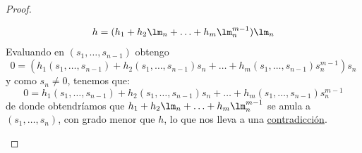 \begin{lema}
\begin{proof}
\begin{itemize}
                \begin{equation*}
                    h = (h_1 + h_2 \lm_n + \ldots + h_m \lm_n^{m-1})\lm_n
                \end{equation*}
                Evaluando en $(s_1, \ldots, s_{n-1})$ obtengo 
                \begin{equation*}
                    0 = (h_1(s_1, \ldots, s_{n-1}) + h_2(s_1, \ldots, s_{n-1})s_n + \ldots + h_m(s_1, \ldots, s_{n-1})s_n^{m-1})s_n
                \end{equation*}
                y como $s_n\neq 0$, tenemos que:
                \begin{equation*}
                     0 = h_1(s_1, \ldots, s_{n-1}) + h_2(s_1, \ldots, s_{n-1})s_n + \ldots + h_m(s_1, \ldots, s_{n-1})s_n^{m-1}
                \end{equation*}
                de donde obtendríamos que $h_1 + h_2\lm_n + \ldots + h_m\lm_n^{m-1}$ se anula a $(s_1, \ldots, s_n)$, con grado menor que $h$, lo que nos lleva a una \underline{contradicción}.
        \end{itemize}
    \end{proof}
\end{lema}

